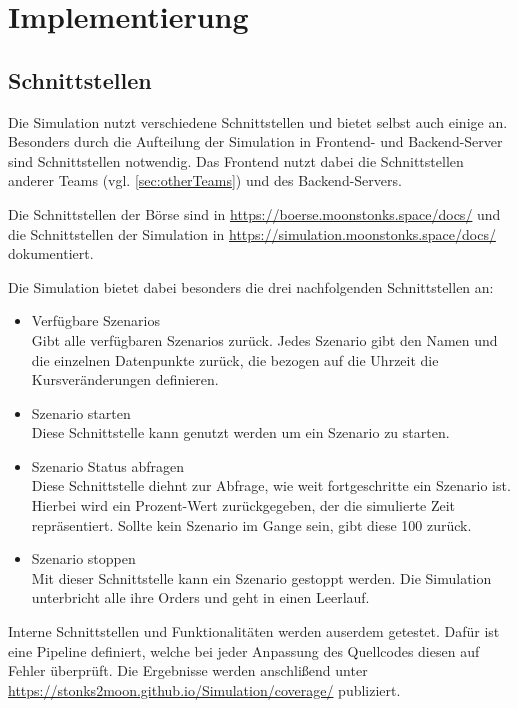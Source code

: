 \chapter{Implementierung}

\section{Schnittstellen}
Die Simulation nutzt verschiedene Schnittstellen und bietet selbst auch einige an. Besonders durch die Aufteilung der Simulation in Frontend- und Backend-Server sind Schnittstellen notwendig.
Das Frontend nutzt dabei die Schnittstellen anderer Teams (vgl. \autoref{sec:otherTeams}) und des Backend-Servers.

Die Schnittstellen der Börse sind in \href{https://boerse.moonstonks.space/docs/}{https://boerse.moonstonks.space/docs/} und die Schnittstellen der Simulation in \href{https://simulation.moonstonks.space/docs/}{https://simulation.moonstonks.space/docs/} dokumentiert.

Die Simulation bietet dabei besonders die drei nachfolgenden Schnittstellen an:
\begin{itemize}
    \item Verfügbare Szenarios\\
        Gibt alle verfügbaren Szenarios zurück. Jedes Szenario gibt den Namen und die einzelnen Datenpunkte zurück, die bezogen auf die Uhrzeit die Kursveränderungen definieren.
    \item Szenario starten\\
        Diese Schnittstelle kann genutzt werden um ein Szenario zu starten.
    \item Szenario Status abfragen\\
        Diese Schnittstelle diehnt zur Abfrage, wie weit fortgeschritte ein Szenario ist. Hierbei wird ein Prozent-Wert zurückgegeben, der die simulierte Zeit repräsentiert. Sollte kein Szenario im Gange sein, gibt diese 100 zurück.
    \item Szenario stoppen\\
        Mit dieser Schnittstelle kann ein Szenario gestoppt werden. Die Simulation unterbricht alle ihre Orders und geht in einen Leerlauf.
\end{itemize}

Interne Schnittstellen und Funktionalitäten werden auserdem getestet.
Dafür ist eine Pipeline definiert, welche bei jeder Anpassung des Quellcodes diesen auf Fehler überprüft.
Die Ergebnisse werden anschlißend unter \href{https://stonks2moon.github.io/Simulation/coverage/}{https://stonks2moon.github.io/Simulation/coverage/} publiziert.


